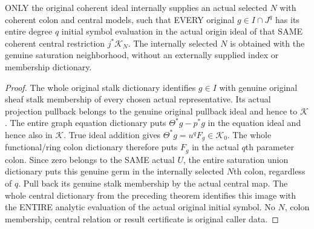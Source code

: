 \begin{theorem}
\label{hir:relative-normal-deformation-initial-relation-central-membership}
\leanok
{}
ONLY the original coherent ideal internally supplies an actual selected $N$
with coherent colon and central models, such that EVERY original $g\in I\cap J^q$
has its entire degree $q$ initial symbol evaluation in the actual origin
ideal of that SAME coherent central restriction $j^*\mathcal K_N$. The internally
selected $N$ is obtained with the genuine saturation neighborhood, without
an externally supplied index or membership dictionary.
\end{theorem}
\begin{proof}
The whole original stalk dictionary identifies $g\in I$ with genuine
original sheaf stalk membership of every chosen actual representative.
Its actual projection pullback belongs to the genuine original pullback
ideal and hence to $\mathcal K$. The entire graph equation dictionary puts
$\Theta^*g-p^*g$ in the equation ideal and hence also in $\mathcal K$.
True ideal addition gives $\Theta^*g=u^qF_g\in\mathcal K_0$.
The whole functional/ring colon dictionary therefore puts $F_g$ in the
actual $q$th parameter colon. Since zero belongs to the SAME actual $U$,
the entire saturation union dictionary puts this genuine germ in the
internally selected $N$th colon, regardless of $q$. Pull back its genuine
stalk membership by the actual central map. The whole central dictionary
from the preceding theorem identifies this image with the ENTIRE analytic
evaluation of the actual original initial symbol. No $N$, colon membership,
central relation or result certificate is original caller data.
\end{proof}

